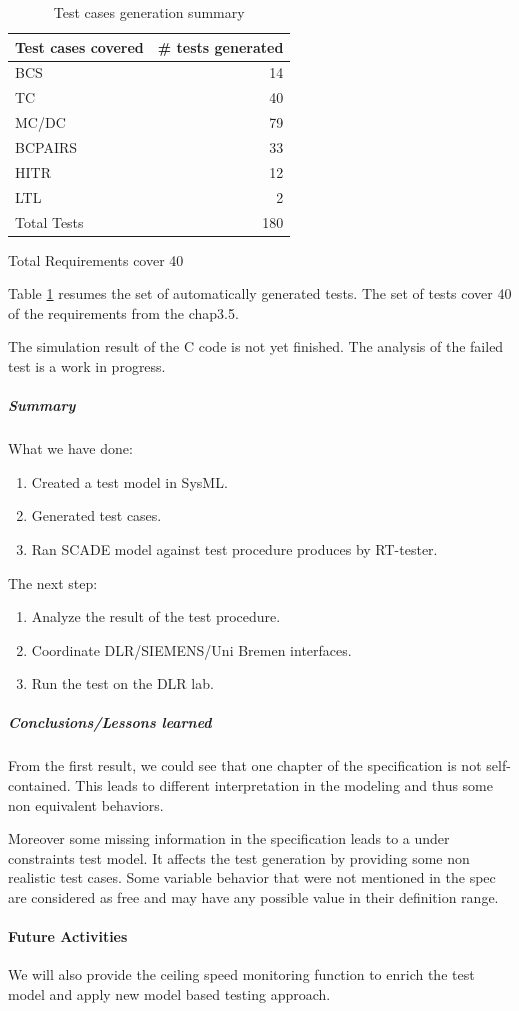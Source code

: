 \begin{table}[htbp]
\centering
\begin{tabular}{lr}\toprule
  Test cases covered & \# tests generated  \\\midrule
  BCS & 14 \\
  TC & 40 \\
  MC/DC & 79 \\
  BCPAIRS & 33\\
  HITR & 12 \\
  LTL & 2 \\ \midrule
  Total Tests& 180\\\bottomrule
\end{tabular}

\vspace{1em}
\raggedleft Total Requirements cover 40
\caption{\label{tbl:test_summary} Test cases generation summary}
\end{table}

Table \ref{tbl:test_summary} resumes the set of automatically
generated tests.
The set of tests cover 40 of the requirements from the chap3.5.

The simulation result of the C code is not yet finished. The analysis
of the failed test is a work in progress.


\subparagraph{Summary}

What we have done:
\begin{enumerate}
\item Created a test model in SysML.
\item Generated test cases.
\item Ran SCADE model against test procedure produces by RT-tester.
\end{enumerate}
 
 The next step:
 \begin{enumerate}
 \item Analyze the result of the test procedure.
 \item Coordinate DLR/SIEMENS/Uni Bremen interfaces.
 \item Run the test on the DLR lab.
 \end{enumerate}
\subparagraph{Conclusions/Lessons learned}
From the first result, we could see that one chapter of
the specification is not self-contained. This leads to different
interpretation in the modeling and thus some non equivalent behaviors.

Moreover some missing information in the specification leads to a
under constraints test model. It affects the test generation by
providing some non realistic test cases. Some variable behavior that
were not mentioned in the spec are considered as free and may have any
possible value in their definition range.
 


\paragraph{Future Activities}
We will also provide the ceiling speed monitoring function to enrich
the test model and apply new model based testing approach.

%
%

